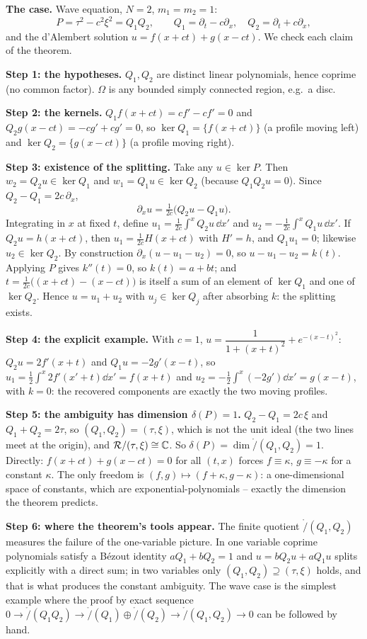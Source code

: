 \medskip\textbf{The case.} Wave equation, $N=2$, $m_1=m_2=1$:
\[
P=\tau^2-c^2\xi^2=Q_1Q_2,\qquad Q_1=\partial_t-c\partial_x,\quad Q_2=\partial_t+c\partial_x,
\]
and the d'Alembert solution $u=f(x+ct)+g(x-ct)$. We check each claim of the theorem.

\medskip\textbf{Step 1: the hypotheses.} $Q_1,Q_2$ are distinct linear polynomials, hence coprime (no common factor). $\Omega$ is any bounded simply connected region, e.g.\ a disc.

\medskip\textbf{Step 2: the kernels.} $Q_1f(x+ct)=cf'-cf'=0$ and $Q_2g(x-ct)=-cg'+cg'=0$, so $\ker Q_1=\{f(x+ct)\}$ (a profile moving left) and $\ker Q_2=\{g(x-ct)\}$ (a profile moving right).

\medskip\textbf{Step 3: existence of the splitting.} Take any $u\in\ker P$. Then $w_2=Q_2u\in\ker Q_1$ and $w_1=Q_1u\in\ker Q_2$ (because $Q_1Q_2u=0$). Since $Q_2-Q_1=2c\,\partial_x$,
\[
\partial_xu=\tfrac1{2c}\big(Q_2u-Q_1u\big).
\]
Integrating in $x$ at fixed $t$, define $u_1=\tfrac1{2c}\int^xQ_2u\,\dd x'$ and $u_2=-\tfrac1{2c}\int^xQ_1u\,\dd x'$. If $Q_2u=h(x+ct)$, then $u_1=\tfrac1{2c}H(x+ct)$ with $H'=h$, and $Q_1u_1=0$; likewise $u_2\in\ker Q_2$. By construction $\partial_x(u-u_1-u_2)=0$, so $u-u_1-u_2=k(t)$. Applying $P$ gives $k''(t)=0$, so $k(t)=a+bt$; and $t=\tfrac1{2c}\big((x+ct)-(x-ct)\big)$ is itself a sum of an element of $\ker Q_1$ and one of $\ker Q_2$. Hence $u=u_1+u_2$ with $u_j\in\ker Q_j$ after absorbing $k$: the splitting exists.

\medskip\textbf{Step 4: the explicit example.} With $c=1$, $u=\dfrac1{1+(x+t)^2}+e^{-(x-t)^2}$: $Q_2u=2f'(x+t)$ and $Q_1u=-2g'(x-t)$, so $u_1=\tfrac12\int^x2f'(x'+t)\dd x'=f(x+t)$ and $u_2=-\tfrac12\int^x(-2g')\dd x'=g(x-t)$, with $k=0$: the recovered components are exactly the two moving profiles.

\medskip\textbf{Step 5: the ambiguity has dimension $\delta(P)=1$.} $Q_2-Q_1=2c\,\xi$ and $Q_1+Q_2=2\tau$, so $(Q_1,Q_2)=(\tau,\xi)$, which is not the unit ideal (the two lines meet at the origin), and $\mathcal{R}/(\tau,\xi)\cong\mathbb{C}$. So $\delta(P)=\dim\ring/(Q_1,Q_2)=1$. Directly: $f(x+ct)+g(x-ct)=0$ for all $(t,x)$ forces $f\equiv\kappa$, $g\equiv-\kappa$ for a constant $\kappa$. The only freedom is $(f,g)\mapsto(f+\kappa,g-\kappa)$: a one-dimensional space of constants, which are exponential-polynomials -- exactly the dimension the theorem predicts.

\medskip\textbf{Step 6: where the theorem's tools appear.} The finite quotient $\ring/(Q_1,Q_2)$ measures the failure of the one-variable picture. In one variable coprime polynomials satisfy a B\'ezout identity $aQ_1+bQ_2=1$ and $u=bQ_2u+aQ_1u$ splits explicitly with a direct sum; in two variables only $(Q_1,Q_2)\supseteq(\tau,\xi)$ holds, and that is what produces the constant ambiguity. The wave case is the simplest example where the proof by exact sequence $0\to\ring/(Q_1Q_2)\to\ring/(Q_1)\oplus\ring/(Q_2)\to\ring/(Q_1,Q_2)\to0$ can be followed by hand.

